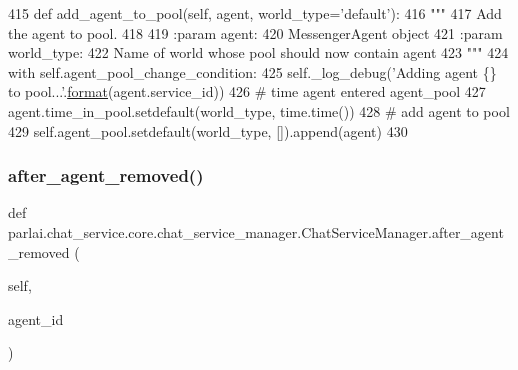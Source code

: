 \begin{DoxyCode}
415     \textcolor{keyword}{def }add\_agent\_to\_pool(self, agent, world\_type='default'):
416         \textcolor{stringliteral}{"""}
417 \textcolor{stringliteral}{        Add the agent to pool.}
418 \textcolor{stringliteral}{}
419 \textcolor{stringliteral}{        :param agent:}
420 \textcolor{stringliteral}{            MessengerAgent object}
421 \textcolor{stringliteral}{        :param world\_type:}
422 \textcolor{stringliteral}{            Name of world whose pool should now contain agent}
423 \textcolor{stringliteral}{        """}
424         with self.agent\_pool\_change\_condition:
425             self.\_log\_debug(\textcolor{stringliteral}{'Adding agent \{\} to pool...'}.\hyperlink{namespaceparlai_1_1chat__service_1_1services_1_1messenger_1_1shared__utils_a32e2e2022b824fbaf80c747160b52a76}{format}(agent.service\_id))
426             \textcolor{comment}{# time agent entered agent\_pool}
427             agent.time\_in\_pool.setdefault(world\_type, time.time())
428             \textcolor{comment}{# add agent to pool}
429             self.agent\_pool.setdefault(world\_type, []).append(agent)
430 
\end{DoxyCode}
\mbox{\label{classparlai_1_1chat__service_1_1core_1_1chat__service__manager_1_1ChatServiceManager_a928461831de4bdb9fb240ae538d0b841}} 
\subsubsection{\texorpdfstring{after\+\_\+agent\+\_\+removed()}{after\_agent\_removed()}}
{\footnotesize\ttfamily def parlai.\+chat\+\_\+service.\+core.\+chat\+\_\+service\+\_\+manager.\+Chat\+Service\+Manager.\+after\+\_\+agent\+\_\+removed (\begin{DoxyParamCaption}\item[{}]{self,  }\item[{}]{agent\+\_\+id }\end{DoxyParamCaption})}

